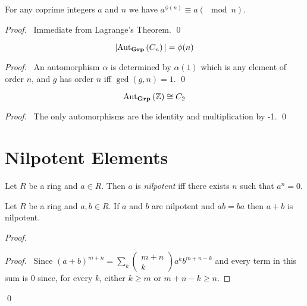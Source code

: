 \begin{thm}
For any coprime integers $a$ and $n$ we have $a^{\phi(n)} \equiv a (\mod n)$.
\end{thm}

\begin{proof}
\pf\ Immediate from Lagrange's Theorem. \qed
\end{proof}

\begin{prop}
    \[ |\mathrm{Aut}_{\mathbf{Grp}} \left( {C_n} \right)| = \phi(n) \]
\end{prop}

\begin{proof}
    \pf\ An automorphism $\alpha$ is determined by $\alpha(1)$ which is any element of order $n$, and $g$ has order $n$ iff $\gcd(g,n) = 1$. \qed
\end{proof}

\begin{ex}
    \[ \mathrm{Aut}_{\mathbf{Grp}} \left( {\mathbb{Z}} \right) \cong C_2 \]
\end{ex}

\begin{proof}
    \pf\ The only automorphisms are the identity and multiplication by -1. \qed
\end{proof}

\section{Nilpotent Elements}

\begin{df}[Nilpotent]
Let $R$ be a ring and $a \in R$. Then $a$ is \emph{nilpotent} iff there exists $n$ such that $a^n = 0$.
\end{df}

\begin{prop}
Let $R$ be a ring and $a,b \in R$. If $a$ and $b$ are nilpotent and $ab = ba$ then $a + b$ is nilpotent.
\end{prop}

\begin{proof}
\pf
{}
\begin{proof}
	\pf\ Since $(a+b)^{m+n} = \sum_k \left( \begin{array}{c} m + n \\ k \end{array} \right) a^k b^{m+n-k}$ and every term in this sum is 0 since, for every $k$, either $k \geq m$ or $m+n-k \geq n$.
\end{proof}
\qed
\end{proof}

